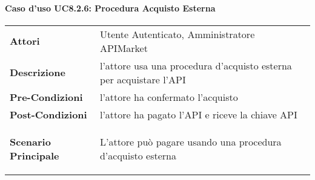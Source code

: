 \paragraph{Caso d'uso UC8.2.6: Procedura Acquisto Esterna}
\label{UC8.2.6}

\renewcommand*{\arraystretch}{1.6}
\begin{longtable}{ l | p{11cm}}
	\hline
	\rowcolor{Gray}
	\multicolumn{2}{c}{UC8.2.6: Procedura Acquisto Esterna} \\
	\hline
	\textbf{Attori} &Utente Autenticato, Amministratore APIMarket\\
	\textbf{Descrizione} & l'attore usa una procedura d'acquisto esterna per acquistare l'API \\
	\textbf{Pre-Condizioni} &  l'attore ha confermato l'acquisto\\
	\textbf{Post-Condizioni}& l'attore ha pagato l'API e riceve la chiave API\\
	\textbf{Scenario Principale} & \begin{enumerate*}[label=(\arabic*.),itemjoin={\newline}]
		\item L'attore può pagare usando una procedura d'acquisto esterna
	\end{enumerate*}\\
\end{longtable}
